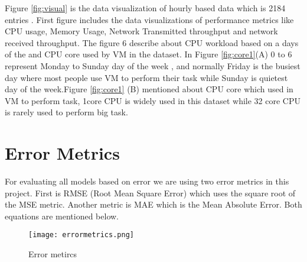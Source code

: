 Figure  \ref{fig:visual} is the data visualization of hourly based data which is 2184 entries . First figure includes the  data visualizations of  performance metrics like CPU usage, Memory Usage, Network Transmitted throughput  and network received throughput. The figure  6 describe about  CPU workload  based on a days of the and CPU core used by VM in the dataset. In
Figure \ref{fig:core1}(A)  0 to 6 represent Monday to Sunday day of the week , and normally  Friday is the busiest day where most  people use VM to perform their task while Sunday is quietest day of the week.Figure \ref{fig:core1} (B)  mentioned about CPU core which used in VM to perform task, 1core CPU is widely used in this dataset while 32 core CPU is rarely used to perform big task.  
\section{Error Metrics}
For evaluating all models based on error we are using two error metrics in this project. First is RMSE (Root Mean Square Error) which uses the square root of the MSE metric. Another metric is MAE which is the Mean Absolute Error. Both equations are mentioned below.

\begin{figure}
  \centering
    
      \texttt{[image: errormetrics.png]}
  \caption{Error metircs}
  \label{fig:error}
\end{figure}
